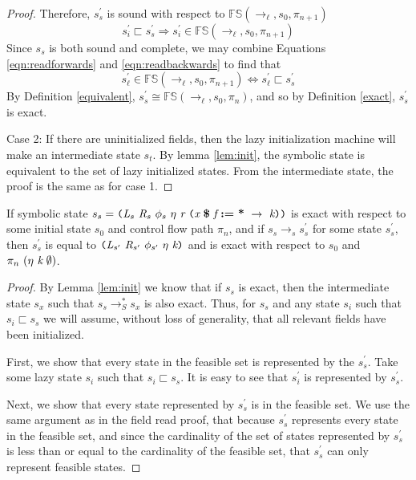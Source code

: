 \begin{proof}
 Therefore, $s_s^\prime$ is sound with respect to $\mathbb{FS}(\rightarrow_{\ell},s_0,\pi_{n+1})$
 \begin{equation}
 \label{eqn:readbackwards}
 s_i^\prime \sqsubset s_s^\prime \Rightarrow s_i^\prime \in \mathbb{FS}(\rightarrow_{\ell},s_0,\pi_{n+1})
 \end{equation}
Since $s_s$ is both sound and complete, we may combine Equations \ref{eqn:readforwards} and \ref{eqn:readbackwards} to find that 
$$s_\ell^\prime \in \mathbb{FS}(\rightarrow_{\ell},s_0,\pi_{n+1}) \Leftrightarrow s_\ell^\prime \sqsubset s_s^\prime$$
By Definition \ref{equivalent}, $s_s^\prime \cong \mathbb{FS}(\rightarrow_{\ell},s_0,\pi_n)$, and so by Definition \ref{exact}, $s_s^\prime$ is exact.

Case 2: If there are uninitialized fields, then the lazy initialization machine will make an intermediate state $s_t$. By lemma \ref{lem:init}, the symbolic state is equivalent to the set of lazy initialized states. From the intermediate state, the proof is the same as for case 1.
\end{proof}

\begin{lemma}
\label{lem:write}
If symbolic state $s_s =  \lp \cfgnt{L}_s\ \cfgnt{R}_s\ \phi_s\ \eta\ \cfgnt{r}\ \lp \cfgnt{x}\ \cfgt{\$}\ \cfgnt{f}\ \cfgt{:=}\ \cfgt{*}\ \rightarrow\ \cfgnt{k}\rp \rp$ is exact with respect to some initial state $s_0$ and control flow path $\pi_n$, and if $s_s \rightarrow_s s_s^\prime$ for some state $s_s^\prime$, then $s_s^\prime$ is equal to $ \lp \cfgnt{L}_{s^\prime}\ \cfgnt{R}_{s^\prime}\ \phi_{s^\prime}\ \eta\ \cfgnt{k}\rp$ and is exact with respect to $s_0$ and $\pi_n \ (\eta\ \cfgnt{k}\ \emptyset)$.

\end{lemma}
\begin{proof}
By Lemma \ref{lem:init} we know that if $s_s$ is exact, then the intermediate state $s_x$ such that $s_s \rightarrow_S^* s_x$ is also exact. Thus, for $s_s$ and any state  $s_i$ such that $s_i \sqsubset s_s$ we will assume, without loss of generality, that all relevant fields have been initialized.

First, we show that every state in the feasible set is represented by the $s_s^\prime$. Take some lazy state $s_i$ such that $s_i \sqsubset s_s$. It is easy to see that $s_i^\prime$ is represented by $s_s^\prime$. 

Next, we show that every state represented by $s_s^\prime$ is in the feasible set. We use the same argument as in the field read proof, that because $s_s^\prime$ represents every state in the feasible set, and since the cardinality of the set of states represented by $s_s^\prime$ is less than or equal to the cardinality of the feasible set, that $s_s^\prime$ can only represent feasible states.

\end{proof}

